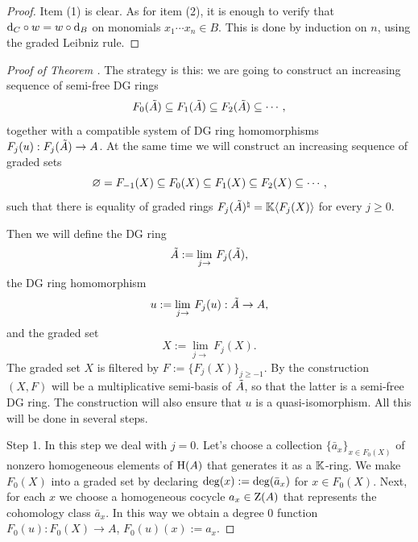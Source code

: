 \begin{proof} 
Item (1) is clear. As for item (2), it is enough to verify that $\mathrm{d}_C \circ w = 
w \circ \mathrm{d}_B$ on monomials $x_1 \cdots x_n \in B$. This is done by induction on 
$n$, using the graded Leibniz rule. 
\end{proof}

\begin{proof}[Proof of Theorem \tup{\ref{thm:4310}}]
The strategy is this: we are going to construct an increasing sequence of 
semi-free DG rings 
\begin{equation} \label{eqn:4945}
F_0(\tilde{A}) \subseteq F_1(\tilde{A}) \subseteq F_2(\tilde{A}) \subseteq \cdots ,
\end{equation}
together with a compatible system of DG ring homomorphisms 
$F_j(u) : \lb F_j(\til{A}) \to A$.
At the same time we will construct an increasing sequence of graded sets
\begin{equation} \label{eqn:4946}
\varnothing = F_{-1}(X) \subseteq F_0(X) \subseteq F_1(X) \subseteq F_2(X) \subseteq \cdots ,
\end{equation}
such that there is equality of graded rings
$F_j(\tilde{A})^{\natural} = \mathbb{K} \langle F_j(X) \rangle$
for every $j \geq 0$. 

Then we will define the DG ring
\begin{equation} \label{eqn:4310}
\tilde{A} := \lim_{j \to} \,  F_j(\tilde{A}) , 
\end{equation}
the DG ring homomorphism
\begin{equation} \label{eqn:4311}
u := \lim_{j \to} \,  F_j(u) : \tilde{A} \to  A ,
\end{equation}
and the graded set 
\begin{equation} \label{eqn:4775}
X := \lim_{j \to} \,  F_j(X) . 
\end{equation}
The graded set $X$ is filtered by 
$F := \bigl\{ F_j(X) \bigr\}_{j \geq -1}$. By the construction 
$(X, F)$ will be a multiplicative semi-basis of $\tilde{A}$, so that the latter 
is a semi-free DG ring. The construction will also ensure that $u$ is a 
quasi-isomorphism. All this will be done in several steps. 

\medskip \noindent
Step 1. In this step we deal with $j = 0$. 
Let's choose a collection $\{ \bar{a}_x \}_{x \in F_0(X)}$
of nonzero homogeneous elements of $\operatorname{H}(A)$ that generates it as a 
$\mathbb{K}$-ring. We make $F_0(X)$ into a graded set by declaring
$\operatorname{deg}(x) := \operatorname{deg}(\bar{a}_x)$ for $x \in F_0(X)$.
Next, for each $x$ we choose a homogeneous cocycle 
$a_x \in \operatorname{Z}(A)$ that represents the cohomology class $\bar{a}_x$. 
In this way we obtain a degree $0$ function
$F_0(u) : F_0(X) \to A$, $F_0(u)(x) := a_x$. 


\end{proof}
